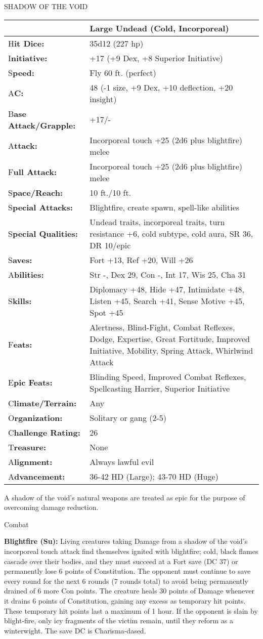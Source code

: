 \documentclass{article}
\begin{document}
{\vspace{12pt}
{\LARGE{}SHADOW OF THE VOID }

\begin{tabular}{|>{\raggedright}p{66pt}|>{\raggedright}p{259pt}|}
\hline
  & Large Undead (Cold, Incorporeal)\tabularnewline
\hline
H\textbf{it Dice:} & 35d12 (227 hp) \tabularnewline
\hline
I\textbf{nitiative:} & +17 (+9 Dex, +8 Superior Initiative) \tabularnewline
\hline
S\textbf{peed:} & Fly 60 ft. (perfect) \tabularnewline
\hline
A\textbf{C:} & 48 (-1 size, +9 Dex, +10 deflection, +20 insight) \tabularnewline
\hline
B\textbf{ase Attack/Grapple:} & +17/-\tabularnewline
\hline
A\textbf{ttack:} & Incorporeal touch +25 (2d6 plus blightfire) melee\tabularnewline
\hline
F\textbf{ull Attack:} & Incorporeal touch +25 (2d6 plus blightfire) melee\tabularnewline
\hline
S\textbf{pace/Reach:} & 10 ft./10 ft. \tabularnewline
\hline
S\textbf{pecial Attacks:} & Blightfire, create spawn, spell-like abilities\tabularnewline
\hline
S\textbf{pecial Qualities:} & Undead traits, incorporeal traits, turn resistance 
+6, cold subtype, cold aura, SR 36, DR 10/epic \tabularnewline
\hline
S\textbf{aves:} & Fort +13, Ref +20, Will +26 \tabularnewline
\hline
A\textbf{bilities:} & Str -, Dex 29, Con -, Int 17, Wis 25, Cha 31 \tabularnewline
\hline
S\textbf{kills:} & Diplomacy +48, Hide +47, Intimidate +48, Listen +45, Search 
+41, Sense Motive +45, Spot +45\tabularnewline
\hline
F\textbf{eats:} & Alertness, Blind-Fight, Combat Reflexes, Dodge, Expertise, Great 
Fortitude, Improved Initiative, Mobility, Spring Attack, Whirlwind Attack \tabularnewline
\hline
E\textbf{pic Feats:} & Blinding Speed, Improved Combat Reflexes, Spellcasting Harrier, 
Superior Initiative \tabularnewline
\hline
C\textbf{limate/Terrain:} & Any \tabularnewline
\hline
O\textbf{rganization:} & Solitary or gang (2-5) \tabularnewline
\hline
C\textbf{hallenge Rating:} & 26 \tabularnewline
\hline
T\textbf{reasure:} & None \tabularnewline
\hline
A\textbf{lignment:} & Always lawful evil \tabularnewline
\hline
A\textbf{dvancement:} & 36-42 HD (Large); 43-70 HD (Huge) \tabularnewline
\hline
\end{tabular}

A shadow of the void's natural weapons are treated as epic for the purpose of overcoming 
damage reduction.

Combat 

\textbf{Blightfire (Su):} Living creatures taking Damage from a shadow of the void's 
incorporeal touch attack find themselves ignited with blightfire; cold, black flames 
cascade over their bodies, and they must succeed at a Fort save (DC 37) or permanently 
lose 6 points of Constitution. The opponent must continue to save every round for 
the next 6 rounds (7 rounds total) to avoid being permanently drained of 6 more 
Con points. The creature heals 30 points of Damage whenever it drains 6 points 
of Constitution, gaining any excess as temporary hit points. These temporary hit 
points last a maximum of 1 hour. If the opponent is slain by blight-fire, only 
icy fragments of the victim remain, until they reform as a winterwight.  The save 
DC is Charisma-dased.

}
\end{document}
